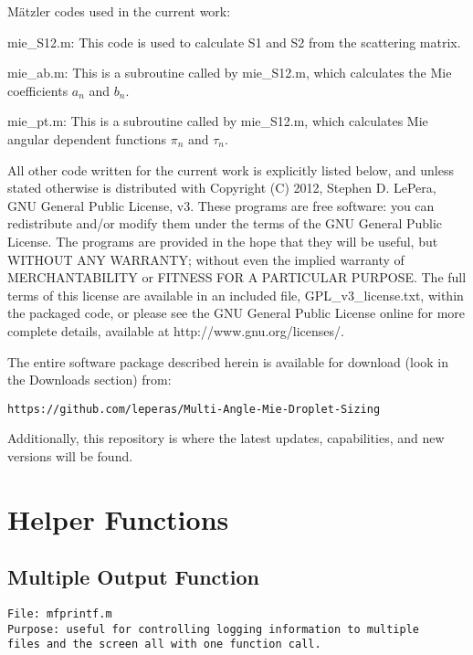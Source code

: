 M{\"a}tzler codes used in the current work:
\begin{compactitem}
\item mie\_S12.m: This code is used to calculate S1 and S2 from the scattering matrix.
\item mie\_ab.m: This is a subroutine called by mie\_S12.m, which calculates the Mie coefficients $a_n$ and $b_n$. 
\item mie\_pt.m: This is a subroutine called by mie\_S12.m, which calculates Mie angular dependent functions $\pi_n$ and $\tau_n$.
\end{compactitem}
\vspace*{0.25in}

All other code written for the current work is explicitly listed below, and unless stated otherwise is distributed with Copyright (C) 2012, Stephen D. LePera,  GNU General Public License, v3.  These programs are free software: you can redistribute and/or modify them under the terms of the GNU General Public License.  The programs are provided in the hope that they will be useful, but WITHOUT ANY WARRANTY; without even the implied warranty of MERCHANTABILITY or FITNESS FOR A PARTICULAR PURPOSE.  The full terms of this license are available in an included file, GPL\_v3\_license.txt, within the packaged code, or please see the GNU General Public License online for more complete details, available at http://www.gnu.org/licenses/.

The entire software package described herein is available for download (look in the Downloads section) from:
\begin{verbatim}
https://github.com/leperas/Multi-Angle-Mie-Droplet-Sizing
\end{verbatim}
Additionally, this repository is where the latest updates, capabilities, and new versions will be found.

\pagebreak
\section{Helper Functions}
\subsection{Multiple Output Function}
\begin{verbatim} 
File: mfprintf.m
Purpose: useful for controlling logging information to multiple 
files and the screen all with one function call.
\end{verbatim}



